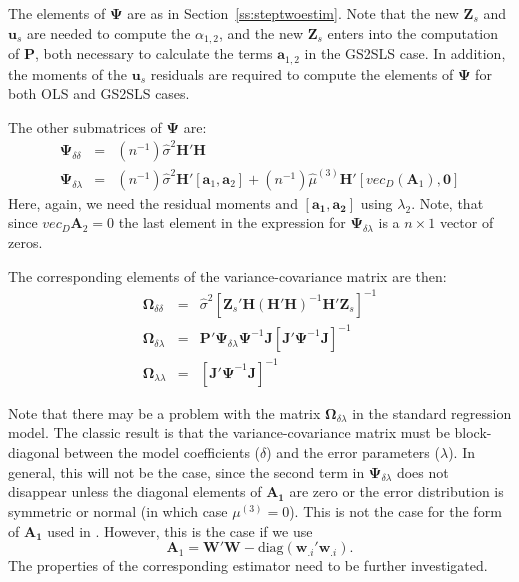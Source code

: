 \documentclass{article}
\begin{document}
The elements of $\mathbf{\Psi}$ are as in Section~\ref{ss:steptwoestim}. Note that the
new $\mathbf{Z}_s$ and $\mathbf{u}_s$ are needed to compute the $\alpha_{1,2}$, and
the new $\mathbf{Z}_s$ enters into the computation of $\mathbf{P}$, both necessary
to calculate the terms $\mathbf{a}_{1, 2}$  in the GS2SLS case. In addition, the moments
of the $\mathbf{u}_s$ residuals are required to compute the elements of $\mathbf{\Psi}$ for
both OLS and GS2SLS cases.

The other submatrices of $\mathbf{\Psi}$ are:
\begin{eqnarray*}
\mathbf{\Psi}_{\delta \delta} &=& (n^{-1}) \hat{\sigma}^2 \mathbf{H}'\mathbf{H}\\
\mathbf{\Psi}_{\delta \lambda} &=&  (n^{-1}) \hat{\sigma}^2  \mathbf{H}'[\mathbf{a}_1, \mathbf{a}_2]
   + (n^{-1}) \hat{\mu}^{(3)} \mathbf{H}'[vec_D(\mathbf{A}_1),\mathbf{0}]
\end{eqnarray*}
Here, again, we need the residual moments and $[\mathbf{a_1, a_2}]$ using $\lambda_2$.
Note, that since $vec_D \mathbf{A}_2 = 0$ the last element in the expression
for $\mathbf{\Psi}_{\delta \lambda}$ is a $n \times 1$ vector of zeros.

The corresponding elements of the variance-covariance matrix are then:
\begin{eqnarray*}
\mathbf{\Omega}_{\delta \delta} &=& \hat{\sigma}^2 [ \mathbf{Z}_s' \mathbf{H} (\mathbf{H'H})^{-1} \mathbf{H}' \mathbf{Z}_s ]^{-1}\\
\mathbf{\Omega}_{\delta \lambda} &=& \mathbf{P}'\mathbf{\Psi}_{\delta \lambda} \mathbf{\Psi}^{-1} \mathbf{J} [ \mathbf{J}' \mathbf{\Psi}^{-1} \mathbf{J} ]^{-1}\\
\mathbf{\Omega}_{\lambda \lambda} &=& [ \mathbf{J}' \mathbf{\Psi}^{-1} \mathbf{J} ]^{-1}
\end{eqnarray*}

Note that there may be a problem with the matrix $\mathbf{\Omega}_{\delta \lambda}$ in the
standard regression model. The classic result is that the variance-covariance matrix must
be block-diagonal between the model coefficients ($\delta$) and the error parameters
($\lambda$). In general, this will not be the case, since the second term in 
$\mathbf{\Psi}_{\delta \lambda} $ does not disappear unless the diagonal elements of
$\mathbf{A_1}$ are zero or the error distribution is symmetric or normal
(in which case $\mu^{(3)} = 0$). This is not the case for the form of $\mathbf{A_1}$ used
in \cite{Drukkeretal:10,Drukkeretal:11}. However, this is the case if we use
\begin{equation*}
\mathbf{A}_1 = \mathbf{W'W} - \mbox{diag} (\mathbf{w}_{.i}'\mathbf{w}_{.i}).
\end{equation*}
The properties of the corresponding estimator need to be further investigated.



\end{document}
